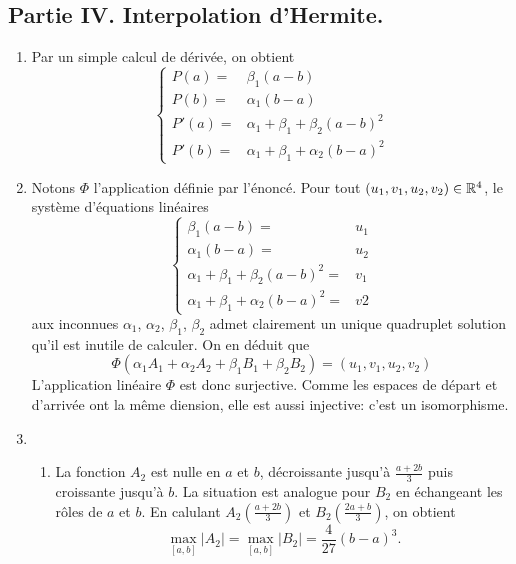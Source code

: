 \subsection*{Partie IV. Interpolation d'Hermite.}
\begin{enumerate}
  \item Par un simple calcul de dérivée, on obtient
\begin{displaymath}
\left\lbrace  
\begin{aligned}
  P(a) =& \beta_1(a-b) \\
  P(b) =& \alpha_1(b-a)\\
  P'(a) =& \alpha_1 + \beta_1 + \beta_2(a-b)^2 \\
  P'(b) =& \alpha_1 + \beta_1 + \alpha_2(b-a)^2
\end{aligned}
\right. 
\end{displaymath}

  \item Notons $\Phi$ l'application définie par l'énoncé. Pour tout $(u_1,v_1,u_2,v_2)\in\mathbb{R}^4$, le système d'équations linéaires 
\begin{displaymath}
\left\lbrace  
\begin{aligned}
  \beta_1(a-b) =& u_1\\
  \alpha_1(b-a) =& u_2\\
  \alpha_1 + \beta_1 + \beta_2(a-b)^2 =& v_1\\
  \alpha_1 + \beta_1 + \alpha_2(b-a)^2 =& v2
\end{aligned}
\right. 
\end{displaymath}
aux inconnues $\alpha_1$, $\alpha_2$, $\beta_1$, $\beta_2$ admet clairement un unique quadruplet solution qu'il est inutile de calculer. On en déduit que 
\begin{displaymath}
  \Phi\left( \alpha_1 A_1 + \alpha_2 A_2 + \beta_1 B_1 + \beta_2 B_2\right) = (u_1,v_1,u_2,v_2)
\end{displaymath}
L'application linéaire $\Phi$ est donc surjective. Comme les espaces de départ et d'arrivée ont la même diension, elle est aussi injective: c'est un isomorphisme.

  \item
\begin{enumerate}
  \item La fonction $A_2$ est nulle en $a$ et $b$, décroissante jusqu'à $\frac{a+2b}{3}$ puis croissante jusqu'à $b$. La situation est analogue pour $B_2$ en échangeant les rôles de $a$ et $b$. En calulant $A_2(\frac{a+2b}{3})$ et $B_2(\frac{2a+b}{3})$, on obtient 
\begin{displaymath}
  \max_{[a,b]}|A_2| = \max_{[a,b]}|B_2| = \frac{4}{27}(b-a)^3.
\end{displaymath}


\end{enumerate}
\end{enumerate}
